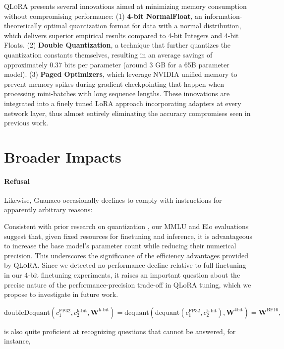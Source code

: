 \textsc{QLoRA} presents several innovations aimed at minimizing memory consumption without compromising performance: (1) \textbf{4-bit NormalFloat}, an information-theoretically optimal quantization format for data with a normal distribution, which delivers superior empirical results compared to 4-bit Integers and 4-bit Floats. (2) \textbf{Double Quantization}, a technique that further quantizes the quantization constants themselves, resulting in an average savings of approximately 0.37 bits per parameter (around 3 GB for a 65B parameter model). (3) \textbf{Paged Optimizers}, which leverage NVIDIA unified memory to prevent memory spikes during gradient checkpointing that happen when processing mini-batches with long sequence lengths. These innovations are integrated into a finely tuned LoRA approach incorporating adapters at every network layer, thus almost entirely eliminating the accuracy compromises seen in previous work.

\section{Broader Impacts}

\paragraph{Refusal} Likewise, {Guanaco} occasionally declines to comply with instructions for apparently arbitrary reasons:

Consistent with prior research on quantization \citep{dettmers2022case}, our MMLU and Elo evaluations suggest that, given fixed resources for finetuning and inference, it is advantageous to increase the base model's parameter count while reducing their numerical precision. This underscores the significance of the efficiency advantages provided by \textsc{QLoRA}. Since we detected no performance decline relative to full finetuning in our 4-bit finetuning experiments, it raises an important question about the precise nature of the performance-precision trade-off in QLoRA tuning, which we propose to investigate in future work.

\begin{equation}
    \text{doubleDequant}(c_1^{\text{FP32}}, c_2^{\text{k-bit}}, \mathbf{W}^{\text{k-bit}}) = \text{dequant}(\text{dequant}(c_1^{\text{FP32}}, c_2^{\text{k-bit}}), \mathbf{W}^{\text{4bit}}) = \mathbf{W}^{\text{BF16}},
\end{equation}

is also quite proficient at recognizing questions that cannot be answered, for instance,

